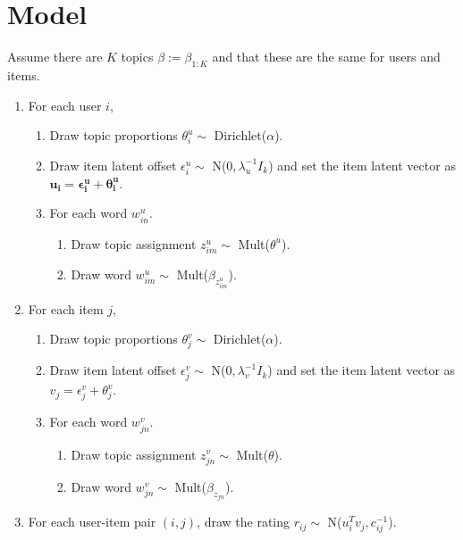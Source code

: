 \documentclass[12pt]{article}
\begin{document}
\maketitle


\section{Model}
Assume there are $K$ topics $\beta := \beta_{1:K}$ and that these are the same for users and items. 


\begin{enumerate}
\item For each user $i$,
\begin{enumerate}
\item  Draw topic proportions  $\theta^u_i \sim$ Dirichlet($\alpha$).
\item  Draw item latent offset  $\epsilon^u_i \sim$ N($0, \lambda_u^{-1} I_k$) and set the item latent vector as $\bm{u_i = \epsilon^u_i + \theta^u_i}$.
\item  For each word $w^u_{in}$.
\begin{enumerate}
\item  Draw topic assignment $z^u_{im} \sim$ Mult($\theta^u$).
\item  Draw word $w^u_{im} \sim$ Mult($\beta_{z^u_{im}}$).
\end{enumerate}
\end{enumerate}


\item For each item $j$,
\begin{enumerate}
\item  Draw topic proportions  $\theta^v_j \sim$ Dirichlet($\alpha$).
\item  Draw item latent offset  $\epsilon^v_j \sim$ N($0, \lambda_v^{-1} I_k$) and set the item latent vector as $v_j = \epsilon^v_j + \theta^v_j$.
\item  For each word $w^v_{jn}$.
\begin{enumerate}
\item  Draw topic assignment $z^v_{jn} \sim$ Mult($\theta$).
\item  Draw word $w^v_{jn} \sim$ Mult($\beta_{z_{jn}}$).
\end{enumerate}
\end{enumerate}

\item For each user-item pair $(i,j)$, draw the rating $r_{ij} \sim$ N($u^T_i v_j, c^{-1}_{ij}$).
\end{enumerate}
\end{document}
